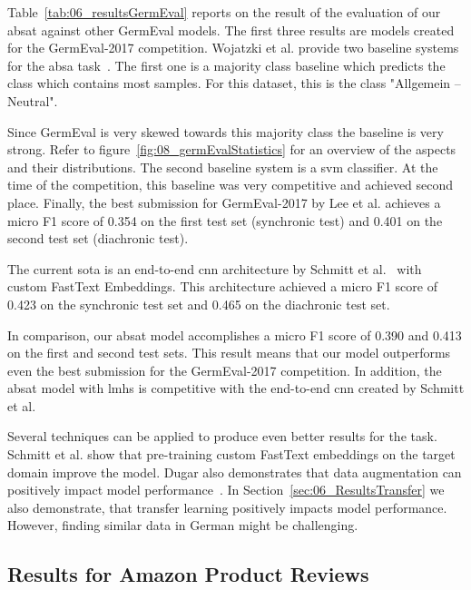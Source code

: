 Table~\ref{tab:06_resultsGermEval} reports on the result of the evaluation of our \gls{absat} against other GermEval models. The first three results are models created for the GermEval-2017 competition. Wojatzki et al. provide two baseline systems for the \gls{absa} task~\cite{Wojatzki2017}. The first one is a majority class baseline which predicts the class which contains most samples. For this dataset, this is the class "Allgemein -- Neutral". 
\medskip

Since GermEval is very skewed towards this majority class the baseline is very strong. Refer to figure~\ref{fig:08_germEvalStatistics} for an overview of the aspects and their distributions. The second baseline system is a \gls{svm} classifier. At the time of the competition, this baseline was very competitive and achieved second place. Finally, the best submission for GermEval-2017 by Lee et al. achieves a micro F1 score of 0.354 on the first test set {(synchronic test)} and 0.401 on the second test set {(diachronic test)}.
\medskip

The current \acrfull{sota} is an end-to-end \gls{cnn} architecture by Schmitt et al.~\cite{Schmitt2018} with custom FastText Embeddings. This architecture achieved a micro F1 score of 0.423 on the synchronic test set and 0.465 on the diachronic test set. 
\medskip

In comparison, our \gls{absat} model accomplishes a micro F1 score of 0.390 and 0.413 on the first and second test sets. This result means that our model outperforms even the best submission for the GermEval-2017 competition. In addition, the \gls{absat} model with \glspl{lmh} is competitive with the end-to-end \gls{cnn} created by Schmitt et al.
\medskip

Several techniques can be applied to produce even better results for the task. Schmitt et al. show that pre-training custom FastText embeddings on the target domain improve the model. Dugar also demonstrates that data augmentation can positively impact model performance~\cite{Dugar2019}. 
\smallskip
In Section~\ref{sec:06_ResultsTransfer} we also demonstrate, that transfer learning positively impacts model performance. However, finding similar data in German might be challenging.

\subsection{Results for Amazon Product Reviews}
\label{sec:06_ResultsAmazon}

